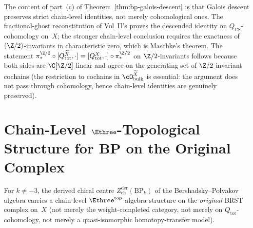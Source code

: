 \begin{remark}
\label{rem:bp-maschke-preservation}
The content of part~(c) of
Theorem~\ref{thm:bp-galois-descent} is that Galois descent
preserves strict chain-level identities, not merely cohomological
ones. The fractional-ghost reconstitution of Vol~II's
\cite[Theorem~\ref*{thm:galois-invariance-descent}]{Vol2-fractional-ghost-platonic}
proves the descended identity on $Q_{\mathrm{CS}}$-cohomology
on~$X$; the stronger chain-level conclusion requires the exactness
of $(\Z/2)$-invariants in characteristic zero, which is
Maschke's theorem. The statement
$\pi_{\ast}^{\Z/2}\circ [Q_{\mathrm{tot}}^{\widetilde X}, \cdot]
 = [Q_{\mathrm{tot}}^{X}, \cdot] \circ \pi_{\ast}^{\Z/2}$ on
$\Z/2$-invariants follows because both sides are $\C[\Z/2]$-linear
and agree on the generating set of $\Z/2$-invariant cochains
(the restriction to cochains in $\cO_{\mathrm{bulk}}^{\widetilde X}$
is essential: the argument does not pass through
cohomology, hence chain-level identities are genuinely preserved).
\end{remark}

\section{Chain-Level $\Ethree$-Topological Structure for BP on the Original Complex}
\label{sec:bp-E3-topological}

\begin{theorem}
\label{thm:bp-chain-level-e3-topological}
\ClaimStatusProvedHere
For $k \ne -3$, the derived chiral centre
$Z^{\mathrm{der}}_{\mathrm{ch}}(\mathrm{BP}_k)$ of the
Bershadsky--Polyakov algebra carries a chain-level
$\Ethree^{\mathrm{top}}$-algebra structure on the \emph{original}
BRST complex on~$X$ (not merely the weight-completed category, not
merely on $Q_{\mathrm{tot}}$-cohomology, not merely a
quasi-isomorphic homotopy-transfer model).
\end{theorem}

